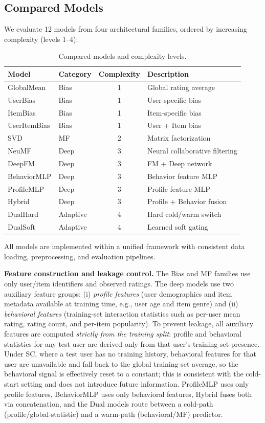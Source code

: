 \documentclass[journal]{IEEEtran}
\begin{document}
\subsection{Compared Models}
\label{sec:models}

We evaluate 12 models from four architectural families, ordered by increasing complexity (levels 1--4):

\begin{table}[!t]
\centering
\caption{Compared models and complexity levels.}
\label{tab:models}
\footnotesize
\begin{tabular}{@{}llcl@{}}
\toprule
Model & Category & Complexity & Description \\
\midrule
GlobalMean & Bias & 1 & Global rating average \\
UserBias & Bias & 1 & User-specific bias \\
ItemBias & Bias & 1 & Item-specific bias \\
UserItemBias & Bias & 1 & User + Item bias \\
SVD & MF & 2 & Matrix factorization \\
NeuMF & Deep & 3 & Neural collaborative filtering \\
DeepFM & Deep & 3 & FM + Deep network \\
BehaviorMLP & Deep & 3 & Behavior feature MLP \\
ProfileMLP & Deep & 3 & Profile feature MLP \\
Hybrid & Deep & 3 & Profile + Behavior fusion \\
DualHard & Adaptive & 4 & Hard cold/warm switch \\
DualSoft & Adaptive & 4 & Learned soft gating \\
\bottomrule
\end{tabular}
\end{table}

All models are implemented within a unified framework with consistent data loading, preprocessing, and evaluation pipelines.

\textbf{Feature construction and leakage control.} The Bias and MF families use only user/item identifiers and observed ratings. The deep models use two auxiliary feature groups: (i) \emph{profile features} (user demographics and item metadata available at training time, e.g., user age and item genre) and (ii) \emph{behavioral features} (training-set interaction statistics such as per-user mean rating, rating count, and per-item popularity). To prevent leakage, all auxiliary features are computed \emph{strictly from the training split}: profile and behavioral statistics for any test user are derived only from that user's training-set presence. Under SC, where a test user has no training history, behavioral features for that user are unavailable and fall back to the global training-set average, so the behavioral signal is effectively reset to a constant; this is consistent with the cold-start setting and does not introduce future information. ProfileMLP uses only profile features, BehaviorMLP uses only behavioral features, Hybrid fuses both via concatenation, and the Dual models route between a cold-path (profile/global-statistic) and a warm-path (behavioral/MF) predictor.
\end{document}
